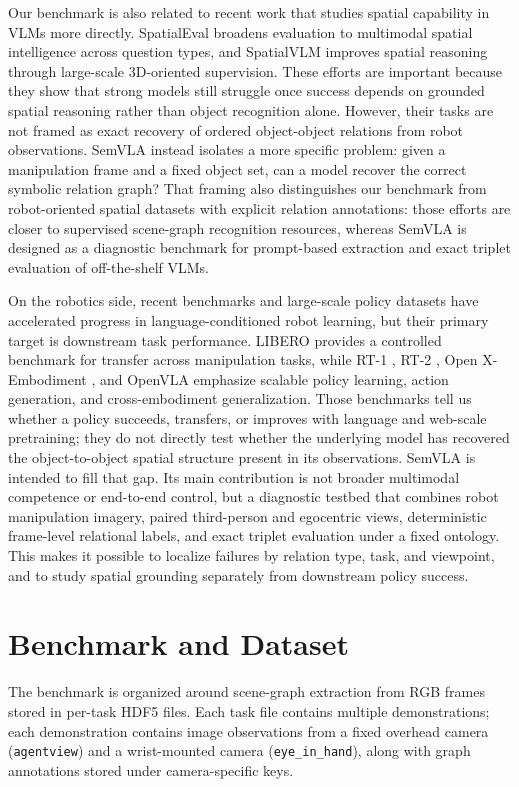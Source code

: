 \documentclass{article}
\begin{document}
Our benchmark is also related to recent work that studies spatial capability in VLMs more directly. SpatialEval \citep{wang2024spatialeval} broadens evaluation to multimodal spatial intelligence across question types, and SpatialVLM \citep{chen2024spatialvlm} improves spatial reasoning through large-scale 3D-oriented supervision. These efforts are important because they show that strong models still struggle once success depends on grounded spatial reasoning rather than object recognition alone. However, their tasks are not framed as exact recovery of ordered object-object relations from robot observations. SemVLA instead isolates a more specific problem: given a manipulation frame and a fixed object set, can a model recover the correct symbolic relation graph? That framing also distinguishes our benchmark from robot-oriented spatial datasets with explicit relation annotations: those efforts are closer to supervised scene-graph recognition resources, whereas SemVLA is designed as a diagnostic benchmark for prompt-based extraction and exact triplet evaluation of off-the-shelf VLMs.

On the robotics side, recent benchmarks and large-scale policy datasets have accelerated progress in language-conditioned robot learning, but their primary target is downstream task performance. LIBERO \citep{liu2023libero} provides a controlled benchmark for transfer across manipulation tasks, while RT-1 \citep{brohan2022rt1}, RT-2 \citep{brohan2023rt2}, Open X-Embodiment \citep{openx2023}, and OpenVLA \citep{kim2024openvla} emphasize scalable policy learning, action generation, and cross-embodiment generalization. Those benchmarks tell us whether a policy succeeds, transfers, or improves with language and web-scale pretraining; they do not directly test whether the underlying model has recovered the object-to-object spatial structure present in its observations. SemVLA is intended to fill that gap. Its main contribution is not broader multimodal competence or end-to-end control, but a diagnostic testbed that combines robot manipulation imagery, paired third-person and egocentric views, deterministic frame-level relational labels, and exact triplet evaluation under a fixed ontology. This makes it possible to localize failures by relation type, task, and viewpoint, and to study spatial grounding separately from downstream policy success.

\section{Benchmark and Dataset}
The benchmark is organized around scene-graph extraction from RGB frames stored in per-task HDF5 files. Each task file contains multiple demonstrations; each demonstration contains image observations from a fixed overhead camera (\texttt{agentview}) and a wrist-mounted camera (\texttt{eye\_in\_hand}), along with graph annotations stored under camera-specific keys.
\end{document}
